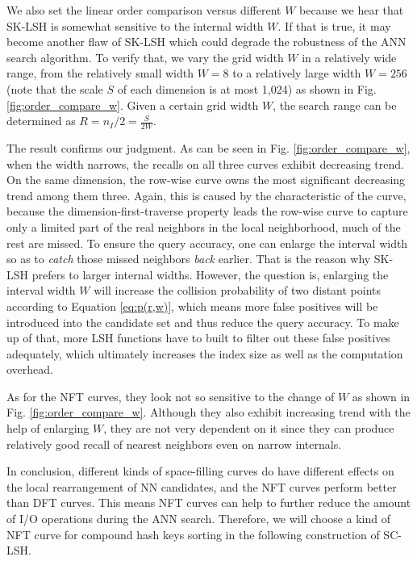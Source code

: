\documentclass[twocolumn]{svjour3}          %
\begin{document}
We also set the linear order comparison versus different $W$ because we hear that SK-LSH is somewhat sensitive to the internal width $W$. If that is true, it may become another flaw of SK-LSH which could degrade the robustness of the ANN search algorithm. To verify that, we vary the grid width $W$ in a relatively wide range, from the relatively small width $W=8$ to a relatively large width $W=256$ (note that the scale $S$ of each dimension is at most 1,024) as shown in Fig. \ref{fig:order_compare_w}. Given a certain grid width $W$, the search range can be determined as $R=n_I/2=\frac{S}{2W}$.

The result confirms our judgment. As can be seen in Fig. \ref{fig:order_compare_w}, when the width narrows, the recalls on all three curves exhibit decreasing trend. On the same dimension, the row-wise curve owns the most significant decreasing trend among them three. Again, this is caused by the characteristic of the curve, because the dimension-first-traverse property leads the row-wise curve to capture only a limited part of the real neighbors in the local neighborhood, much of the rest are missed. To ensure the query accuracy, one can enlarge the interval width so as to \emph{catch} those missed neighbors \emph{back} earlier. That is the reason why SK-LSH prefers to larger internal widths. However, the question is, enlarging the interval width $W$ will increase the collision probability of two distant points according to Equation \ref{eq:p(r,w)}, which means more false positives will be introduced into the candidate set and thus reduce the query accuracy. To make up of that, more LSH functions have to built to filter out these false positives adequately, which ultimately increases the index size as well as the computation overhead.

As for the NFT curves, they look not so sensitive to the change of $W$ as shown in Fig. \ref{fig:order_compare_w}. Although they also exhibit increasing trend with the help of enlarging $W$, they are not very dependent on it since they can produce relatively good recall of nearest neighbors even on narrow internals. 

In conclusion, different kinds of space-filling curves do have different effects on the local rearrangement of NN candidates, and the NFT curves perform better than DFT curves. This means NFT curves can help to further reduce the amount of I/O operations during the ANN search. Therefore, we will choose a kind of NFT curve for compound hash keys sorting in the following construction of SC-LSH.
\end{document}
